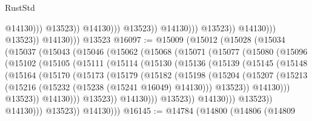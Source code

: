 \begin{lexlean}{RustStd}
\begin{coremodule}
                                                  @14130)))
                                            @13523))
                                        @14130)))
                                  @13523))
                              @14130)))
                        @13523))
                    @14130)))
              @13523))
          @14130)))
    @13523
@16097 := @15009
    (@15012
      (@15028
        (@15034
          (@15037
            (@15043
              (@15046
                (@15062
                  (@15068
                    (@15071
                      (@15077
                        (@15080
                          (@15096
                            (@15102
                              (@15105
                                (@15111
                                  (@15114
                                    (@15130
                                      (@15136
                                        (@15139
                                          (@15145
                                            (@15148
                                              (@15164
                                                (@15170
                                                  (@15173
                                                    (@15179
                                                      (@15182
                                                        (@15198
                                                          (@15204
                                                            (@15207
                                                              (@15213
                                                                (@15216
                                                                  (@15232
                                                                    (@15238
                                                                      (@15241 @16049)
                                                                      @14130)))
                                                                @13523))
                                                            @14130)))
                                                      @13523))
                                                  @14130)))
                                            @13523))
                                        @14130)))
                                  @13523))
                              @14130)))
                        @13523))
                    @14130)))
              @13523))
          @14130)))
@16145 := @14784
    (@14800
      (@14806
        (@14809

\end{coremodule}
\end{lexlean}
